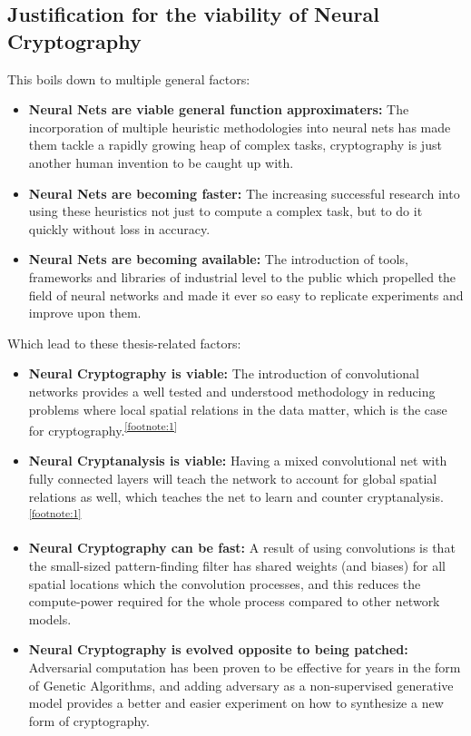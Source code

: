 \documentclass[a4paper, 12pt]{report}
\begin{document}
\subsection{\textbf{Justification for the viability of Neural Cryptography}}
This boils down to multiple general factors:
\begin{itemize}[nosep]
	\item \textbf{Neural Nets are viable general function approximaters:} The incorporation of multiple heuristic methodologies into neural nets has made them tackle a rapidly growing heap of complex tasks, cryptography is just another human invention to be caught up with.
	\item \textbf{Neural Nets are becoming faster:} The increasing successful research into using these heuristics not just to compute a complex task, but to do it quickly without loss in accuracy.
	\item \textbf{Neural Nets are becoming available:} The introduction of tools, frameworks and libraries of industrial level to the public which propelled the field of neural networks and made it ever so easy to replicate experiments and improve upon them.
\end{itemize}
Which lead to these thesis-related factors:
\begin{itemize}[nosep]
	\item \textbf{Neural Cryptography is viable:} The introduction of convolutional networks provides a well tested and understood methodology in reducing problems where local spatial relations in the data matter, which is the case for cryptography.\textsuperscript{\ref{footnote:1}}
	\item \textbf{Neural Cryptanalysis is viable:} Having a mixed convolutional net with fully connected layers will teach the network to account for global spatial relations as well, which teaches the net to learn and counter cryptanalysis.\textsuperscript{\ref{footnote:1}}
	\item \textbf{Neural Cryptography can be fast:} A result of using convolutions is that the small-sized pattern-finding filter has shared weights (and biases) for all spatial locations which the convolution processes, and this reduces the compute-power required for the whole process compared to other network models.
	\item \textbf{Neural Cryptography is evolved opposite to being patched:} Adversarial computation has been proven to be effective for years in the form of Genetic Algorithms, and adding adversary as a non-supervised generative model provides a better and easier experiment on how to synthesize a new form of cryptography.
\end{itemize}
\newpage
\end{document}
